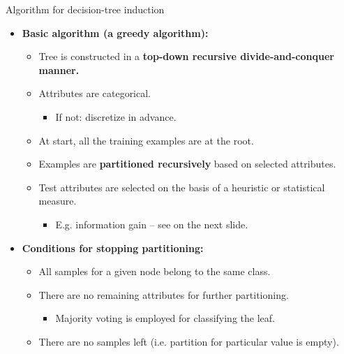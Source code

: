\documentclass[aspectratio=169,t,table]{beamer}
\begin{document}
  {
    \begin{frame}{Algorithm for decision-tree induction}
        \begin{itemize}
            \item \textbf{Basic algorithm (a greedy algorithm):}
            \begin{itemize}
              \item Tree is constructed in a \textbf{\color{airforceblue}top-down recursive divide-and-conquer manner.}
              \item Attributes are categorical.
              \begin{itemize}
                \item If not: discretize in advance.
              \end{itemize}
              \item At start, all the training examples are at the root.
              \item Examples are \textbf{\color{airforceblue}partitioned recursively} based on selected attributes.
              \item Test attributes are selected on the basis of a heuristic or statistical measure.
              \begin{itemize}
                \item E.g. information gain -- see on the next slide.
              \end{itemize}
            \end{itemize}
            \item \textbf{Conditions for stopping partitioning:}
            \begin{itemize}
              \item All samples for a given node belong to the same class.
              \item There are no remaining attributes for further partitioning.
              \begin{itemize}
                \item Majority voting is employed for classifying the leaf.
              \end{itemize}
              \item There are no samples left (i.e. partition for particular value is empty).
            \end{itemize}
        \end{itemize}
    \end{frame}
  }
\end{document}
